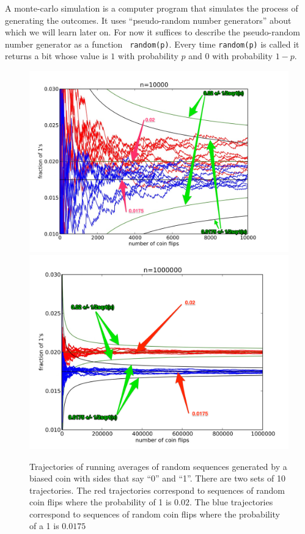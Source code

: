A monte-carlo simulation is a computer program that simulates the
process of generating the outcomes. It uses ``pseudo-random number
generators'' about which we will learn later on. For now it suffices
to describe the pseudo-random number generator as a function {\tt
  random(p)}. Every time {\tt random(p)} is called it returns a bit
whose value is $1$ with probability $p$ and $0$ with probability
$1-p$.

\begin{figure}[p]
\begin{center}
\includegraphics[width=5in]{figs/averages10000.png}
\includegraphics[width=5in]{figs/averages1000000.png}
\end{center}
\caption{\label{fig:Averages} Trajectories of running averages of
  random sequences generated by a biased coin with sides that say
  ``0'' and ``1''. There are two sets of 10 trajectories. The red
  trajectories correspond to sequences of random coin flips where the
  probability of 1 is $0.02$. The blue trajectories correspond to
  sequences of random coin flips where the probability of a 1 is
  $0.0175$}
\end{figure}

